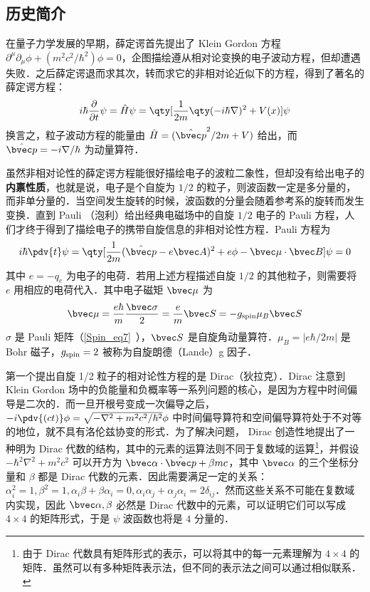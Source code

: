 
\subsection{历史简介}
在量子力学发展的早期，薛定谔首先提出了 Klein Gordon 方程 $\partial^\mu \partial_\mu \phi+(m^2c^2/\hbar^2)\phi=0$，企图描绘遵从相对论变换的电子波动方程，但却遭遇失败．之后薛定谔退而求其次，转而求它的非相对论近似下的方程，得到了著名的薛定谔方程：
\begin{equation}
i\hbar \frac{\partial }{\partial t}\psi = \hat H\psi=\qty[\frac{ 1}{2m}\qty(-i\hbar\nabla)^2+V(x)]\psi
\end{equation}
换言之，粒子波动方程的能量由 $\hat H=(\hat{\bvec p}^2/2m+V)$ 给出，而 $\hat{\bvec p}=-i\nabla/\hbar$ 为动量算符．

虽然非相对论性的薛定谔方程能很好描绘电子的波粒二象性，但却没有给出电子的\textbf{内禀性质}，也就是说，电子是个自旋为 $1/2$ 的粒子，则波函数一定是多分量的，而非单分量的．当空间发生旋转的时候，波函数的分量会随着参考系的旋转而发生变换．直到 Pauli （泡利）给出经典电磁场中的自旋 $1/2$ 电子的 Pauli 方程，人们才终于得到了描绘电子的携带自旋信息的非相对论性方程．Pauli 方程为
\begin{equation}
i\hbar\pdv{t} \psi=\qty[\frac{1}{2m}(\hat{\bvec p}-e\bvec A)^2+e\phi-\bvec \mu\cdot \bvec B]\psi = 0
\end{equation}
其中 $e=-q_e$ 为电子的电荷．若用上述方程描述自旋 $1/2$ 的其他粒子，则需要将 $e$ 用相应的电荷代入．其中电子磁矩 $\bvec \mu$ 为
\begin{equation}
\bvec \mu = \frac{e\hbar}{m}\frac{\bvec \sigma}{2}=\frac{e}{m}\bvec S=-g_{\rm spin}\mu_B \bvec S
\end{equation}
$\sigma$ 是 Pauli 矩阵（\autoref{Spin_eq7}~），$\bvec S$ 是自旋角动量算符．$\mu_B=|e\hbar/2m|$ 是 Bohr 磁子，$g_{\rm spin}=2$ 被称为自旋朗德（Lande）g 因子．

第一个提出自旋 1/2 粒子的相对论性方程的是 Dirac（狄拉克）．Dirac 注意到 Klein Gordon 场中的负能量和负概率等一系列问题的核心，是因为方程中时间偏导是二次的．而一旦开根号变成一次偏导之后，$-i\pdv{(ct)} \phi=\sqrt{-\nabla^2+m^2c^2/\hbar^2}\phi$ 中时间偏导算符和空间偏导算符处于不对等的地位，就不具有洛伦兹协变的形式．为了解决问题， Dirac 创造性地提出了一种明为 Dirac 代数的结构，其中的元素的运算法则不同于复数域的运算\footnote{由于 Dirac 代数具有矩阵形式的表示，可以将其中的每一元素理解为 $4\times 4$ 的矩阵．虽然可以有多种矩阵表示法，但不同的表示法之间可以通过相似联系．}，并假设 $-\hbar^2\nabla^2+m^2c^2$ 可以开方为 $\bvec \alpha \cdot \hat{\bvec p}+\beta mc$，其中 $\bvec \alpha$ 的三个坐标分量和 $\beta$ 都是 Dirac 代数的元素．因此需要满足一定的关系：$\alpha_i^2=1,\beta^2=1,\alpha_i\beta+\beta \alpha_i=0,\alpha_i\alpha_j+\alpha_j\alpha_i=2\delta_{ij}$．然而这些关系不可能在复数域内实现，因此 $\bvec \alpha,\beta$ 必然是 Dirac 代数中的元素，可以证明它们可以写成 $4\times 4$ 的矩阵形式，于是 $\psi$ 波函数也将是 $4$ 分量的．

